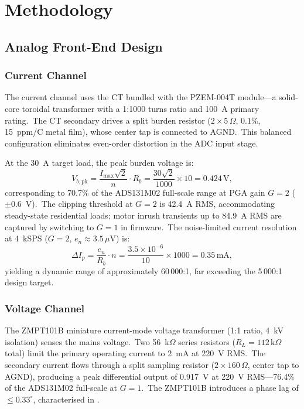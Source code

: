\documentclass[conference]{IEEEtran}
\begin{document}
\section{Methodology}
\label{sec:method}

\subsection{Analog Front-End Design}
\label{ssec:afe}

\subsubsection{Current Channel}

The current channel uses the CT bundled with the PZEM-004T module---a
solid-core toroidal transformer with a 1:1000 turns ratio and
100~A primary rating.\ The CT secondary drives a split burden resistor
(\(2 \times 5\,\Omega\), 0.1\%, 15~ppm/\textdegree C metal film),
whose center tap is connected to AGND.\ This balanced configuration
eliminates even-order distortion in the ADC input stage.

At the 30~A target load, the peak burden voltage is:
\begin{equation}
  V_{b,\text{pk}} = \frac{I_{\max}\sqrt{2}}{n} \cdot R_b
                  = \frac{30\sqrt{2}}{1000} \times 10 = 0.424\,\text{V},
  \label{eq:burden_v}
\end{equation}
corresponding to 70.7\% of the ADS131M02 full-scale range at PGA
gain \(G = 2\) (\(\pm 0.6\)~V).\ The clipping threshold at \(G = 2\)
is 42.4~A RMS, accommodating steady-state residential loads; motor
inrush transients up to 84.9~A RMS are captured by switching to
\(G = 1\) in firmware.\ The noise-limited current resolution at
4~kSPS (\(G = 2\), \(e_n \approx 3.5\,\mu\text{V}\)) is:
\begin{equation}
  \Delta I_{p} = \frac{e_n}{R_b} \cdot n
               = \frac{3.5 \times 10^{-6}}{10} \times 1000
               = 0.35\,\text{mA},
  \label{eq:i_resolution}
\end{equation}
yielding a dynamic range of approximately 60\,000:1, far exceeding the
5\,000:1 design target.

\subsubsection{Voltage Channel}

The ZMPT101B miniature current-mode voltage transformer (1:1 ratio,
4~kV isolation) senses the mains voltage.\ Two 56~k\(\Omega\) series
resistors (\(R_L = 112\,\text{k}\Omega\) total) limit the primary
operating current to 2~mA at 220~V RMS.\ The secondary current flows
through a split sampling resistor (\(2 \times 160\,\Omega\), center
tap to AGND), producing a peak differential output of 0.917~V at
220~V RMS---76.4\% of the ADS131M02 full-scale at \(G = 1\).\ The
ZMPT101B introduces a phase lag of \(\le 0.33^\circ\), characterised in
\cite{zmpt101b_datasheet}.
\end{document}
